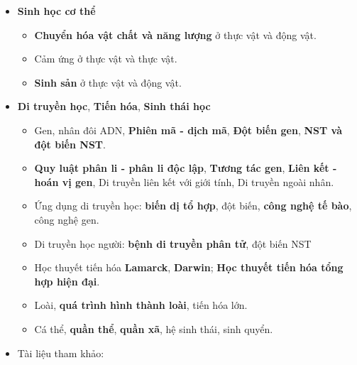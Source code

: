 \begin{enumerate}
\begin{itemize}
\begin{itemize}
        \end{itemize}
        \item \textbf{Sinh học cơ thể}
        \begin{itemize}
            \item \textbf{Chuyển hóa vật chất và năng lượng} ở thực vật và động vật.
            \item Cảm ứng ở thực vật và thực vật.
            \item \textbf{Sinh sản} ở thực vật và động vật.
        \end{itemize}
        \item \textbf{Di truyền học}, \textbf{Tiến hóa}, \textbf{Sinh thái học}
        \begin{itemize}
            \item Gen, nhân đôi ADN, \textbf{Phiên mã - dịch mã}, \textbf{Đột biến gen}, \textbf{NST và đột biến NST}.
            \item \textbf{Quy luật phân li - phân li độc lập}, \textbf{Tương tác gen}, \textbf{Liên kết - hoán vị gen}, Di truyền liên kết với giới tính, Di truyền ngoài nhân.
            \item Ứng dụng di truyền học: \textbf{biến dị tổ hợp}, đột biến, \textbf{công nghệ tế bào}, công nghệ gen.
            \item Di truyền học người: \textbf{bệnh di truyền phân tử}, đột biến NST
            \item Học thuyết tiến hóa \textbf{Lamarck}, \textbf{Darwin}; \textbf{Học thuyết tiến hóa tổng hợp hiện đại}.
            \item Loài, \textbf{quá trình hình thành loài}, tiến hóa lớn.
            \item Cá thể, \textbf{quần thể}, \textbf{quần xã}, hệ sinh thái, sinh quyển.
        \end{itemize}
        \item Tài liệu tham khảo: 
    \end{itemize}
\end{enumerate}

